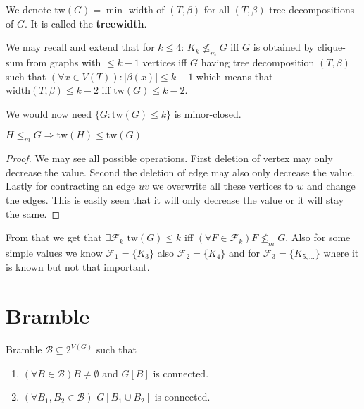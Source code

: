 \begin{defn}
	We denote $\text{tw}(G) = \min$ width of $(T, \beta)$ for all $(T, \beta)$ tree decompositions of $G$. It is called the \textbf{treewidth}.
\end{defn}

We may recall and extend that for $k \leq 4$: $K_{k} \nleq_{m} G$ iff $G$ is obtained by clique-sum from graphs with $\leq k-1$ vertices iff $G$ having tree decomposition $(T, \beta)$ such that $(\forall x \in V(T)) : |\beta(x)| \leq k-1$ which means that $\text{width}(T, \beta) \leq k - 2$ iff $\text{tw}(G) \leq k - 2$.

We would now need $\{G : \text{tw}(G) \leq k\}$ is minor-closed.

\begin{observ}
	$H \leq_{m} G \Rightarrow \text{tw}(H) \leq \text{tw}(G)$
\end{observ}

\begin{proof}
	We may see all possible operations. First deletion of vertex may only decrease the value. Second the deletion of edge may also only decrease the value. Lastly for contracting an edge $uv$ we overwrite all these vertices to $w$ and change the edges. This is easily seen that it will only decrease the value or it will stay the same.
\end{proof}

From that we get that $\exists \mathcal{F}_{k}$ $\text{tw}(G) \leq k$ iff $(\forall F \in \mathcal{F}_{k}) F \nleq_{m} G$. Also for some simple values we know $\mathcal{F}_{1} = \{K_{3}\}$ also $\mathcal{F}_{2} = \{K_{4}\}$ and for $\mathcal{F}_{3} = \{K_{5, \dots }\}$ where it is known but not that important.

\section{Bramble}

\begin{defn}
	Bramble $\mathcal{B} \subseteq 2^{V(G)}$ such that
	
	\begin{enumerate}[(1)]
		\item $(\forall B \in \mathcal{B}) B \neq \emptyset$ and $G[B]$ is connected.
		\item $(\forall B_{1}, B_{2} \in \mathcal{B})$ $G[B_{1} \cup B_{2}]$ is connected.
	\end{enumerate}
\end{defn}


